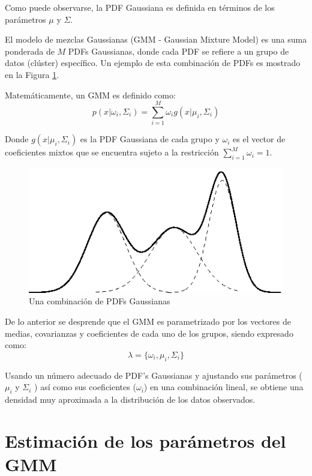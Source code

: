 \documentclass[a4paper]{article}
\begin{document}
Como puede observarse, la PDF Gaussiana es definida en términos de los parámetros $\mu$ y $\Sigma$.


El modelo de mezclas Gaussianas (GMM - Gaussian Mixture Model) es una suma ponderada de $M$ PDFs Gaussianas, donde cada PDF se refiere a un grupo de datos (clúster) específico.
Un ejemplo de esta combinación de PDFs es mostrado en la Figura \ref{fig:fig-gmm}.

Matemáticamente, un GMM es definido como:
\begin{equation}
p(x|\omega _i,\Sigma _i) = \sum_{i=1}^{M}\omega _ig(x|\mu _i,\Sigma_i)
\end{equation}

Donde $g(x|\mu _i,\Sigma_i)$ es la PDF Gaussiana de cada grupo y $\omega _i$ es el vector de coeficientes mixtos que se encuentra sujeto a la restricción $\sum_{i=1}^{M}\omega _i = 1$.

\begin{figure}
	\centering
	\includegraphics[scale=0.3]{resources/images/gmm}
	\caption{Una combinación de PDFs Gaussianas}
	\label{fig:fig-gmm}
\end{figure}

De lo anterior se desprende que el GMM es parametrizado por los vectores de medias, covarianzas y coeficientes de cada uno de los grupos, siendo expresado como:
$$
\lambda = \{ \omega _i, \mu _i, \Sigma _i \}
$$


Usando un número adecuado de PDF's Gaussianas y ajustando sus parámetros ($\mu _i$ y $\Sigma_i$ ) así como sus coeficientes ($\omega _i$) en una combinación lineal, se obtiene una densidad muy aproximada a la distribución de los datos observados.

\section{Estimación de los parámetros del GMM} %
\label{sec:estimación_de_los_parámetros_del_gmm}
\end{document}

